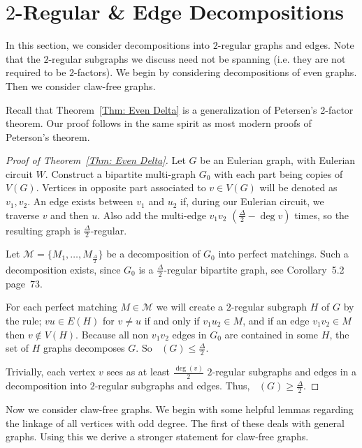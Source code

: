 \documentclass[11pt]{amsart}
\theoremstyle{definition}
\DeclareMathOperator{\re}{f_{re}}
\begin{document}
\section{$2$-Regular \& Edge Decompositions}
\label{Sec: 2-reg and edges}


In this section, we consider decompositions into $2$-regular graphs and edges.
Note that the $2$-regular subgraphs we discuss need not be spanning (i.e. they are not required to be $2$-factors).
We begin by considering decompositions of even graphs.
Then we consider claw-free graphs.


Recall that Theorem~\ref{Thm: Even Delta} is a generalization of Petersen's 2-factor theorem.
Our proof follows in the same spirit as most modern proofs of Peterson's theorem.


\begin{proof}[Proof of Theorem~\ref{Thm: Even Delta}]
Let $G$ be an Eulerian graph, with Eulerian circuit $W$. Construct a bipartite multi-graph $G_0$ with each part being copies of $V(G)$.
Vertices in opposite part associated to $v\in V(G)$ will be denoted as $v_1,v_2$.
An edge exists between $v_1$ and $u_2$ if, during our Eulerian circuit, we traverse $v$ and then $u$. 
Also add the multi-edge $v_1v_2$ $(\frac{\Delta}{2}-\deg{v})$ times, so the resulting graph is $\frac{\Delta}{2}$-regular.


Let $\mathcal{M} = \{M_1,\dots, M_{\frac{\Delta}{2}}\}$ be a decomposition of $G_0$ into perfect matchings.
Such a decomposition exists, since  $G_0$ is a $\frac{\Delta}{2}$-regular bipartite graph, see \cite{bondy1976graph} Corollary~5.2 page~73.

For each perfect matching $M\in\mathcal{M}$ we will create a $2$-regular subgraph $H$ of $G$ by the rule; 
$vu\in E(H)$ for $v\not=u$ if and only if
$v_1u_2\in M$, and if an edge $v_1v_2 \in M$ then $v\not \in V(H)$. Because all non $v_1v_2$ edges in $G_0$ are contained in some $H$, the set of $H$ graphs decomposes $G$.    
So $\re(G)\leq \frac{\Delta}{2}$.

Trivially, each vertex $v$ sees as at least $\frac{\deg(v)}{2}$ $2$-regular subgraphs and edges in a decomposition into $2$-regular subgraphs and edges.
Thus, $\re(G) \geq \frac{\Delta}{2}$.
\end{proof}




Now we consider claw-free graphs.
We begin with some helpful lemmas regarding the linkage of all vertices with odd degree.
The first of these deals with general graphs.
Using this we derive a stronger statement for claw-free graphs.
\end{document}
